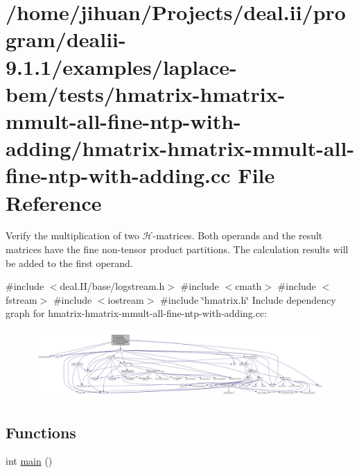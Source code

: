 \hypertarget{hmatrix-hmatrix-mmult-all-fine-ntp-with-adding_8cc}{}\section{/home/jihuan/\+Projects/deal.ii/program/dealii-\/9.1.1/examples/laplace-\/bem/tests/hmatrix-\/hmatrix-\/mmult-\/all-\/fine-\/ntp-\/with-\/adding/hmatrix-\/hmatrix-\/mmult-\/all-\/fine-\/ntp-\/with-\/adding.cc File Reference}
\label{hmatrix-hmatrix-mmult-all-fine-ntp-with-adding_8cc}


Verify the multiplication of two $\mathcal{H}$-\/matrices. Both operands and the result matrices have the fine non-\/tensor product partitions. The calculation results will be added to the first operand.  


{\ttfamily \#include $<$deal.\+I\+I/base/logstream.\+h$>$}\newline
{\ttfamily \#include $<$cmath$>$}\newline
{\ttfamily \#include $<$fstream$>$}\newline
{\ttfamily \#include $<$iostream$>$}\newline
{\ttfamily \#include \char`\"{}hmatrix.\+h\char`\"{}}\newline
Include dependency graph for hmatrix-\/hmatrix-\/mmult-\/all-\/fine-\/ntp-\/with-\/adding.cc\+:
\nopagebreak
\begin{figure}[H]
\begin{center}
\leavevmode
\includegraphics[width=350pt]{hmatrix-hmatrix-mmult-all-fine-ntp-with-adding_8cc__incl}
\end{center}
\end{figure}
\subsection*{Functions}
\begin{DoxyCompactItemize}
\item 
int \hyperlink{hmatrix-hmatrix-mmult-all-fine-ntp-with-adding_8cc_ae66f6b31b5ad750f1fe042a706a4e3d4}{main} ()
\end{DoxyCompactItemize}


